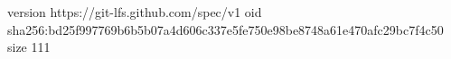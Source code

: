 version https://git-lfs.github.com/spec/v1
oid sha256:bd25f997769b6b5b07a4d606c337e5fe750e98be8748a61e470afc29bc7f4c50
size 111
